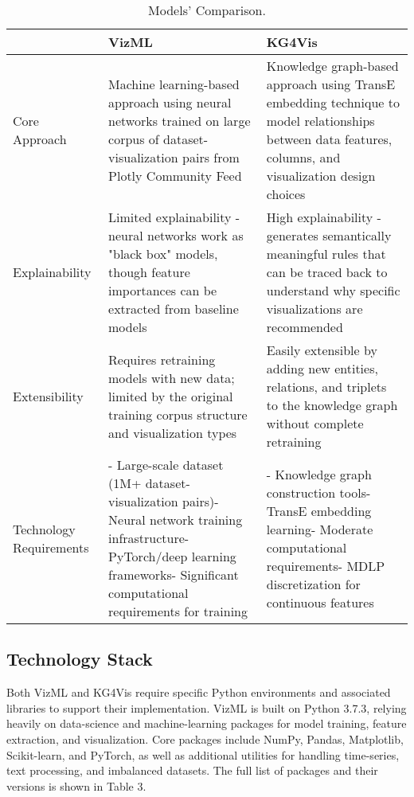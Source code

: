 \begin{table}[H]
    \centering
    \caption{Models' Comparison.}
    \begin{tabular}{|p{2cm}|p{4.4cm}|p{4.4cm}|}
    \hline
    \ & \textbf{VizML} & \textbf{KG4Vis} \\
    \hline
    Core  \newline Approach & Machine learning-based approach using neural networks trained on large corpus of dataset-visualization pairs from Plotly Community Feed & Knowledge graph-based approach using TransE embedding technique to model relationships between data features, columns, and visualization design choices \\
    \hline
    Explainability & Limited explainability - neural networks work as "black box" models, though feature importances can be extracted from baseline models & High explainability - generates semantically meaningful rules that can be traced back to understand why specific visualizations are recommended \\
    \hline
    Extensibility & Requires retraining models with new data; limited by the original training corpus structure and visualization types & Easily extensible by adding new entities, relations, and triplets to the knowledge graph without complete retraining \\
    \hline
    Technology \newline Requirements & - Large-scale dataset (1M+ dataset-visualization pairs)\newline- Neural network training infrastructure\newline- PyTorch/deep learning frameworks\newline- Significant computational requirements for training & - Knowledge graph construction tools\newline- TransE embedding learning\newline- Moderate computational requirements\newline- MDLP discretization for continuous features \\

    
    \hline
    \end{tabular}
    \end{table}

\subsection{Technology Stack}

Both VizML and KG4Vis require specific Python environments and associated libraries to support their implementation. VizML is built on Python 3.7.3, relying heavily on data-science and machine-learning packages for model training, feature extraction, and visualization. Core packages include NumPy, Pandas, Matplotlib, Scikit-learn, and PyTorch, as well as additional utilities for handling time-series, text processing, and imbalanced datasets. The full list of packages and their versions is shown in Table 3.

